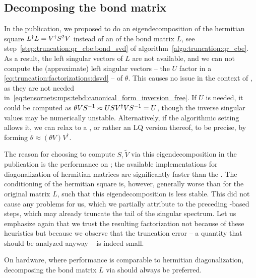 %

\subsection{Decomposing the bond matrix}
\label{subsec:truncation:qr_tebd:bond_matrix}
%
In the publication, we proposed to do an eigendecomposition of the hermitian square $L^\dagger L = \tilde{V}^\dagger S^2\tilde{V}$ instead of an  of the bond matrix $L$, see step~\ref{step:truncation:qr_cbe:bond_svd} of algorithm~\ref{algo:truncation:qr_cbe}.
%
As a result, the left singular vectors of $L$ are not available, and we can not compute the (approximate) left singular vectors -- the $U$ factor in a  \eqref{eq:truncation:factorizations:dsvd} -- of $\theta$.
%
This causes no issue in the context of , as they are not needed in~\eqref{eq:tensornets:mps:tebd:canonical_form_inversion_free}.
%
If $U$ is needed, it could be computed as $\theta V S^{-1} \approx U S V^\dagger V S^{-1} = U$, though the inverse singular values may be numerically unstable.
%
Alternatively, if the algorithmic setting allows it, we can relax to a , or rather an LQ version thereof, to be precise, by forming $\theta \approx (\theta V) V^\dagger$.



%
The reason for choosing to compute $S, \tilde{V}$ via this eigendecomposition in the publication is the performance on ; the available  implementations for diagonalization of hermitian matrices are significantly faster than the .
%
The conditioning of the hermitian square is, however, generally worse than for the original matrix $L$, such that this eigendecomposition is less stable.
%
This did not cause any problems for us, which we partially attribute to the preceding -based steps, which may already truncate the tail of the singular spectrum.
%
Let us emphasize again that we trust the resulting factorization not because of these heuristics but because we observe that the truncation error -- a quantity that should be analyzed anyway -- is indeed small.



On  hardware, where  performance is comparable to hermitian diagonalization, decomposing the bond matrix $L$ via  should always be preferred.

